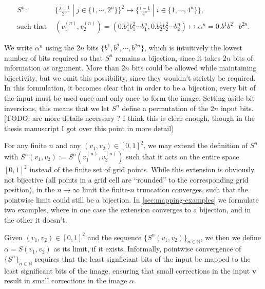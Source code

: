 \documentclass[10pt,letterpaper]{article}
\renewcommand{\vec}[1]{\boldsymbol{#1}}
\begin{document}
\begin{equation} \label{eq:def-S} \begin{aligned}
S^n :& \{\tfrac{j-1}{2^n}\;|\;j\in\{1,\cdots,2^n\}\}^2 \mapsto \{\tfrac{i-1}{4^n}\;|\;i\in\{1,\cdots,4^n\}\},\\
\text{such that }&(v_1^{(n)}, v_2^{(n)}) = (0.b_1^1 b_1^2 \cdots b_1^n, 0.b_2^1 b_2^2 \cdots b_2^n) \mapsto \alpha^n = 0.b^1 b^2 \cdots b^{2n}.
\end{aligned} \end{equation}


We write $\alpha^n$ using the $2n$ bits $\{b^1, b^2, \cdots, b^{2n}\}$, which is intuitively the lowest number of bits required so that $S^n$ remains a bijection, since it takes $2n$ bits of information as argument. More than $2n$ bits could be allowed while maintaining bijectivity, but we omit this possibility, since they wouldn't strictly be required. In this formulation, it becomes clear that in order to be a bijection, every bit of the input must be used once and only once to form the image. Setting aside bit inversions, this means that we let $S^n$ define a permutation of the $2n$ input bits. [TODO: are more details necessary ? I think this is clear enough, though in the thesis manuscript I got over this point in more detail]

For any finite $n$ and any $(v_1,v_2) \in [0,1]^2$, we may extend the definition of $S^n$ with $S^n(v_1, v_2) := S^n(v_1^{(n)}, v_2^{(n)})$ such that it acts on the entire space $[0,1]^2$ instead of the finite set of grid points. While this extension is obviously not bijective (all points in a grid cell are ``rounded'' to the corresponding grid position), in the $n \to \infty$ limit the finite-$n$ truncation converges, such that the pointwise limit could still be a bijection. In \autoref{sec:mapping-examples} we formulate two examples, where in one case the extension converges to a bijection, and in the other it doesn't.

Given $(v_1, v_2) \in [0,1]^2$ and the sequence $\{S^n(v_1, v_2)\}_{n \in \mathbb N}$, we then we define $\alpha = S(v_1, v_2)$ as its limit, if it exists. Informally, pointwise convergence of $\{S^n\}_{n\in\mathbb N}$ requires that the least signficiant bits of the input be mapped to the least significant bits of the image, ensuring that small corrections in the input $\vec{v}$ result in small corrections in the image $\alpha$.
\end{document}
